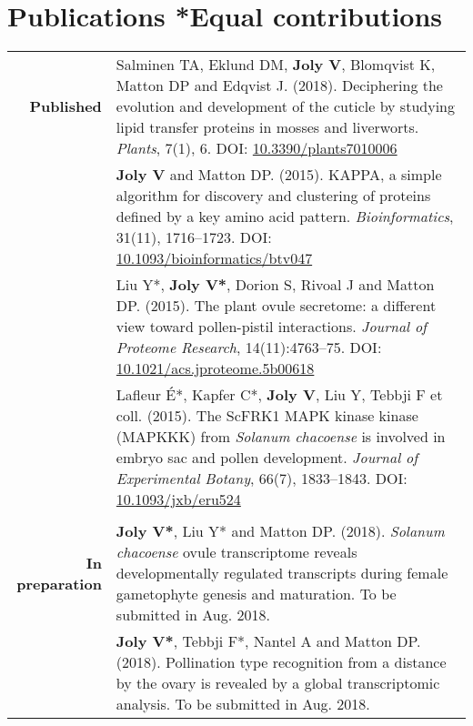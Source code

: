 \documentclass[letterpaper,10pt]{article}
\begin{document}
\section[Publications]{Publications \hfill \small{*Equal contributions}}
\begin{tabular}{r|p{13.8cm}}

\textbf{Published}

& Salminen TA, Eklund DM, \textbf{Joly V}, Blomqvist K, Matton DP
  and Edqvist J. (2018).
  Deciphering the evolution and development of the cuticle by studying lipid
  transfer proteins in mosses and liverworts.
  \emph{Plants}, 7(1), 6.
  DOI: \href{http://doi.org/10.3390/plants7010006}{10.3390/plants7010006}
  \vspace{3mm} \\

& \textbf{Joly V} and Matton DP. (2015).
  KAPPA, a simple algorithm for discovery and clustering of proteins defined by
  a key amino acid pattern.
  \emph{Bioinformatics}, 31(11), 1716--1723.
  DOI: \href{http://doi.org/10.1093/bioinformatics/btv047}
  {10.1093/bioinformatics/btv047}
  \vspace{3mm} \\

& Liu Y*, \textbf{Joly V*}, Dorion S, Rivoal J and Matton DP. (2015).
  The plant ovule secretome: a different view toward pollen-pistil interactions.
  \emph{Journal of Proteome Research}, 14(11):4763--75.
  DOI: \href{http://doi.org/10.1021/acs.jproteome.5b00618}
  {10.1021/acs.jproteome.5b00618}
  \vspace{3mm} \\

& Lafleur É*, Kapfer C*, \textbf{Joly V}, Liu Y, Tebbji F et coll. (2015).
  The ScFRK1 MAPK kinase kinase (MAPKKK) from \emph{Solanum chacoense} is
  involved in embryo sac and pollen development.
  \emph{Journal of Experimental Botany}, 66(7), 1833--1843.
  DOI: \href{http://doi.org/10.1093/jxb/eru524}{10.1093/jxb/eru524}
  \\

\multicolumn{2}{c}{} \\

\textbf{In preparation}

& \textbf{Joly V*}, Liu Y* and Matton DP. (2018).
  \emph{Solanum chacoense} ovule transcriptome reveals developmentally regulated
  transcripts during female gametophyte genesis and maturation.
  To be submitted in Aug. 2018.
  \vspace{3mm} \\

& \textbf{Joly V*}, Tebbji F*, Nantel A and Matton DP. (2018).
  Pollination type recognition from a distance by the ovary is revealed by a
  global transcriptomic analysis.
  To be submitted in Aug. 2018.
  \\

\end{tabular}
\end{document}
